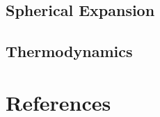 \documentclass[11pt]{book}
\begin{document}
\chapter{Spherical Expansion}


\chapter{Thermodynamics}


\part{References}

\renewcommand\bibname{References}


\end{document}

